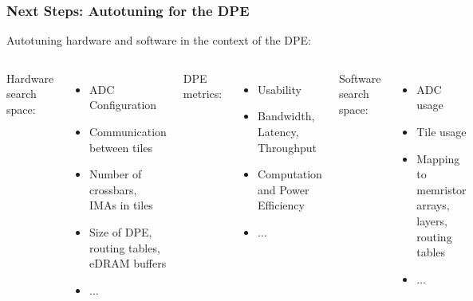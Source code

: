 \documentclass[10pt, compress, aspectratio=169]{beamer}
\begin{document}
%

\begin{frame}
    \frametitle{Next Steps: Autotuning for the DPE}
    Autotuning \alert{hardware and software} in the context of the DPE:

    \begin{columns}[T,onlytextwidth]
        \alert{Hardware search space}:
        \begin{itemize}
            \item ADC Configuration
            \item Communication between tiles
            \item Number of crossbars, IMAs in tiles
            \item Size of DPE, routing tables, eDRAM buffers
            \item $\dots$
        \end{itemize}

        \alert{DPE metrics}:
        \begin{itemize}
            \item Usability
            \item Bandwidth, Latency, Throughput
            \item Computation and Power Efficiency
            \item $\dots$
        \end{itemize}

        \alert{Software search space}:
        \begin{itemize}
            \item ADC usage
            \item Tile usage
            \item Mapping to memristor arrays, layers, routing tables
            \item $\dots$
        \end{itemize}


\end{columns}
\end{frame}
\end{document}
